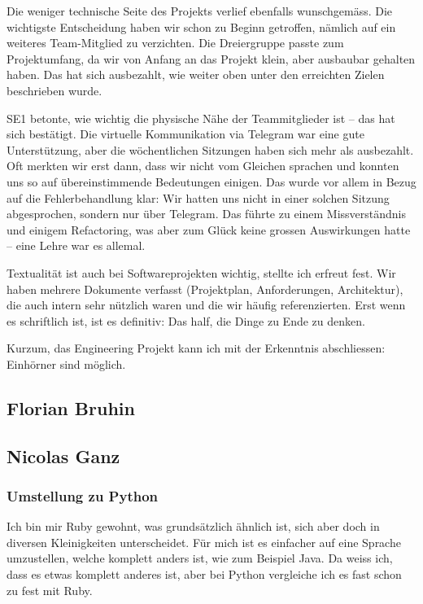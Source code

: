 \documentclass[a4paper]{article}
\begin{document}
Die weniger technische Seite des Projekts verlief ebenfalls wunschgemäss. Die wichtigste Entscheidung haben wir schon zu Beginn getroffen, nämlich auf ein weiteres Team-Mitglied zu verzichten. Die Dreiergruppe passte zum Projektumfang, da wir von Anfang an das Projekt klein, aber ausbaubar gehalten haben. Das hat sich ausbezahlt, wie weiter oben unter den erreichten Zielen beschrieben wurde.

SE1 betonte, wie wichtig die physische Nähe der Teammitglieder ist -- das hat sich bestätigt. Die virtuelle Kommunikation via Telegram war eine gute Unterstützung, aber die wöchentlichen Sitzungen haben sich mehr als ausbezahlt. Oft merkten wir erst dann, dass wir nicht vom Gleichen sprachen und konnten uns so auf übereinstimmende Bedeutungen einigen. Das wurde vor allem in Bezug auf die Fehlerbehandlung klar: Wir hatten uns nicht in einer solchen Sitzung abgesprochen, sondern nur über Telegram. Das führte zu einem Missverständnis und einigem Refactoring, was aber zum Glück keine grossen Auswirkungen hatte -- eine Lehre war es allemal.

Textualität ist auch bei Softwareprojekten wichtig, stellte ich erfreut fest. Wir haben mehrere Dokumente verfasst (Projektplan, Anforderungen, Architektur), die auch intern sehr nützlich waren und die wir häufig referenzierten. Erst wenn es schriftlich ist, ist es definitiv: Das half, die Dinge zu Ende zu denken.

Kurzum, das Engineering Projekt kann ich mit der Erkenntnis abschliessen: Einhörner sind möglich.

\subsection{Florian Bruhin}


\subsection{Nicolas Ganz}

\subsubsection{Umstellung zu Python}

Ich bin mir Ruby gewohnt, was grundsätzlich ähnlich ist, sich aber doch in diversen Kleinigkeiten unterscheidet.
Für mich ist es einfacher auf eine Sprache umzustellen, welche komplett anders ist, wie zum Beispiel Java.
Da weiss ich, dass es etwas komplett anderes ist, aber bei Python vergleiche ich es fast schon zu fest mit Ruby.
\end{document}
